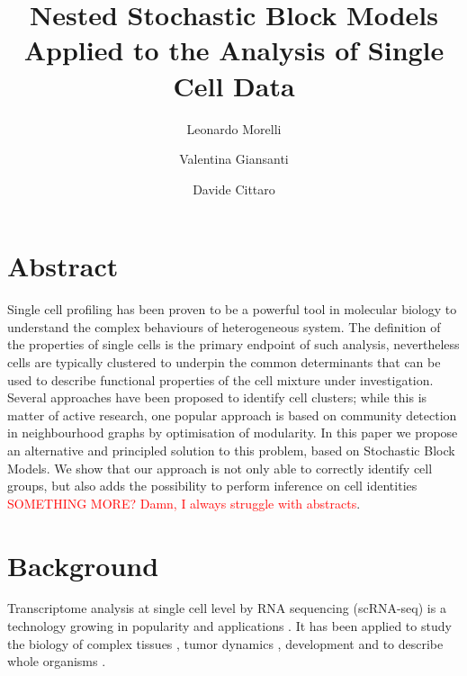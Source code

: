 \documentclass[10pt]{article}
\begin{document}
\title{Nested Stochastic Block Models Applied to the Analysis of Single Cell Data}
\author[1,2]{Leonardo Morelli}
\author[1,3]{Valentina Giansanti}
\author[1]{Davide Cittaro}
\maketitle

\section*{Abstract}

Single cell profiling has been proven to be a powerful tool in molecular biology to understand the complex behaviours of heterogeneous system. The definition of the  properties of single cells is the primary endpoint of such analysis, nevertheless cells are typically clustered to underpin the common determinants that can be used to describe functional properties of the cell mixture under investigation. Several approaches have been proposed to identify cell clusters; while this is matter of active research, one popular approach is based on community detection in neighbourhood graphs by optimisation of modularity. In this paper we propose an alternative and principled solution to this problem, based on Stochastic Block Models. We show that our approach is not only able to correctly identify cell groups, but also adds the possibility to perform inference on cell identities \textcolor{red}{SOMETHING MORE? Damn, I always struggle with abstracts}.


\section*{Background}

Transcriptome analysis at single cell level by RNA sequencing (scRNA-seq) is a technology growing in popularity and applications \cite{svensson_2018}. It has been applied to study the biology of complex tissues \cite{guo_2018, ventotormo_2018}, tumor dynamics \cite{rozenblattrosen_2020, tirosh_2016, patel_2014, neftel_2019}, development \cite{rosenberg_2018, wagner_2018} and to describe whole organisms \cite{plass_2018, regev_2017}.
\end{document}
